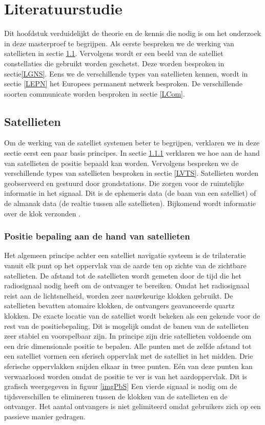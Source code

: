\chapter{Literatuurstudie}
\label{Literatuurstudie}
Dit hoofdstuk verduidelijkt de theorie en de kennis die nodig is om het onderzoek in deze masterproef te begrijpen. Als eerste bespreken we de werking van satellieten in sectie \ref{LSat}. Vervolgens wordt er een beeld van de satelliet constellaties die gebruikt worden geschetst. Deze worden besproken in sectie\ref{LGNS}. Eens we de verschillende types van satellieten kennen, wordt in sectie \ref{LEPN} het Europees permanent netwerk besproken. De verschillende soorten communicate worden besproken in sectie \ref{LCom}.

\section{Satellieten}
\label{LSat}
Om de werking van de satelliet systemen beter te begrijpen, verklaren we in deze sectie eerst een paar basis principes. In sectie \ref{LPbS} verklaren we hoe aan de hand van satellieten de positie bepaald kan worden. Vervolgens bespreken we de verschillende types van satellieten  besproken in sectie \ref{LVTS}. Satellieten worden geobserveerd en gestuurd door grondstations. Die zorgen voor de ruimtelijke informatie in het signaal. Dit is de ephemeris data (de baan van een satelliet) of de almanak data (de realtie tussen alle satellieten). Bijkomend wordt informatie over de klok verzonden \cite{LBibGNSS8}.

\subsection{Positie bepaling aan de hand van satellieten}
\label{LPbS}
Het algemeen principe achter een satelliet navigatie systeem is de trilateratie vanuit elk punt op het oppervlak van de aarde ten op zichte van de zichtbare satellieten.  De afstand tot de satellieten wordt gemeten door de tijd die het radiosignaal nodig heeft om de ontvanger te bereiken. Omdat het radiosignaal reist aan de lichtsnelheid, worden zeer nauwkeurige klokken gebruikt. De satellieten bevatten atomaire klokken, de ontvangers geavanceerde quartz klokken. De exacte locatie van de satelliet wordt bekeken als een gekende voor de rest van de positiebepaling. Dit is mogelijk omdat de banen van de satellieten zeer stabiel en voorspelbaar zijn. In principe zijn drie satellieten voldoende om een drie dimensionale positie te bepalen. Alle punten met de zelfde afstand tot een satelliet vormen een sferisch oppervlak met de satelliet in het midden. Drie sferische oppervlakken snijden elkaar in twee punten. E\'en van deze punten kan verwaarloosd worden omdat de positie te ver is van het aardoppervlak. Dit is grafisch weergegeven in figuur \ref{imgPbS} Een vierde signaal is nodig om de tijdsverschillen te elimineren tussen de klokken van de satellieten en de ontvanger. Het aantal ontvangers is niet gelimiteerd omdat gebruikers zich op een passieve manier gedragen.
 
